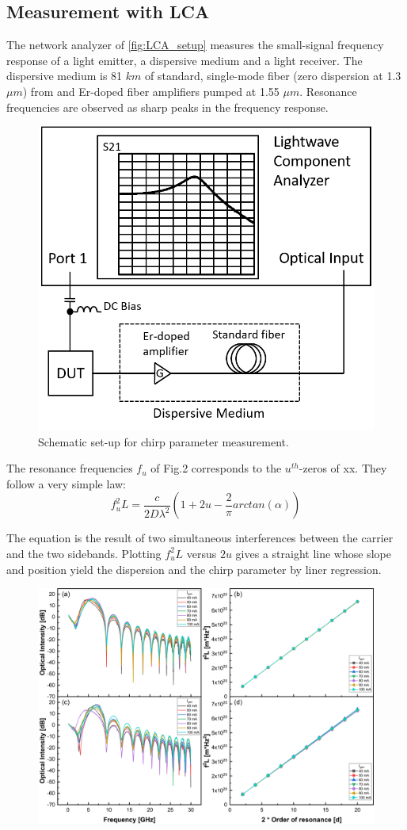 \subsection{Measurement with LCA}\label{subsec:measurement_with_LCA}
The network analyzer of \autoref{fig:LCA_setup} measures the small-signal frequency response of a light emitter, a dispersive medium and a light receiver. The dispersive medium is 81 $km$ of standard, single-mode fiber (zero dispersion at 1.3 $\mu m$) from and Er-doped fiber amplifiers pumped at 1.55 $\mu m$. Resonance frequencies are observed as sharp peaks in the frequency response.
\begin{figure}[ht]
    \centering
    \includegraphics[width=.5\linewidth]{figures/LCA_setup.png}
    \caption{Schematic set-up for chirp parameter measurement.}
    \label{fig:LCA_setup}
\end{figure}

The resonance frequencies $f_u$ of Fig.2 corresponds to the $u^{th}$-zeros of xx. They follow a very simple law:
\begin{equation}
    f_u^2L=\frac{c}{2D\lambda ^2}(1+2u-\frac{2}{\pi}arctan(\alpha))
    \label{eq:LCA_equation}
\end{equation}

The equation is the result of two simultaneous interferences between the carrier and the two sidebands. Plotting $f_u^2L$ versus $2u$ gives a straight line whose slope and position yield the dispersion and the chirp parameter by liner regression.

\begin{figure}[ht]
    \centering
    \includegraphics[width=\linewidth]{figures/chirp_cleaved_and_lensed_4679.png}
    \caption{}
    \label{fig:chirp_cleaved_and_lensed}
\end{figure}


